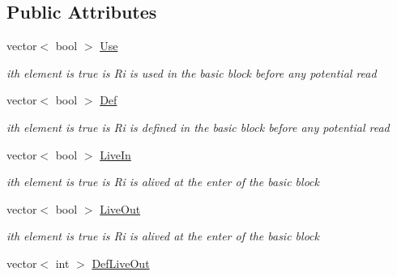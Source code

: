 \subsection*{Public Attributes}
\begin{DoxyCompactItemize}
\item 
\hypertarget{class_basic__block_ab7802e6562cdb846d793a5a834b4678f}{}vector$<$ bool $>$ \hyperlink{class_basic__block_ab7802e6562cdb846d793a5a834b4678f}{Use}\label{class_basic__block_ab7802e6562cdb846d793a5a834b4678f}

\begin{DoxyCompactList}\small\item\em ith element is true is Ri is used in the basic block before any potential read \end{DoxyCompactList}\item 
\hypertarget{class_basic__block_a061288c8556fe1e29c75cc1864d67700}{}vector$<$ bool $>$ \hyperlink{class_basic__block_a061288c8556fe1e29c75cc1864d67700}{Def}\label{class_basic__block_a061288c8556fe1e29c75cc1864d67700}

\begin{DoxyCompactList}\small\item\em ith element is true is Ri is defined in the basic block before any potential read \end{DoxyCompactList}\item 
\hypertarget{class_basic__block_ac772aedee0db949ff13844ee8a809e62}{}vector$<$ bool $>$ \hyperlink{class_basic__block_ac772aedee0db949ff13844ee8a809e62}{Live\+In}\label{class_basic__block_ac772aedee0db949ff13844ee8a809e62}

\begin{DoxyCompactList}\small\item\em ith element is true is Ri is alived at the enter of the basic block \end{DoxyCompactList}\item 
\hypertarget{class_basic__block_a054946200a56d8c248f5a2ad7f1e1790}{}vector$<$ bool $>$ \hyperlink{class_basic__block_a054946200a56d8c248f5a2ad7f1e1790}{Live\+Out}\label{class_basic__block_a054946200a56d8c248f5a2ad7f1e1790}

\begin{DoxyCompactList}\small\item\em ith element is true is Ri is alived at the enter of the basic block \end{DoxyCompactList}\item 
\hypertarget{class_basic__block_ae55324175eed352b99bdf3b366cdb168}{}vector$<$ int $>$ \hyperlink{class_basic__block_ae55324175eed352b99bdf3b366cdb168}{Def\+Live\+Out}\label{class_basic__block_ae55324175eed352b99bdf3b366cdb168}


\end{DoxyCompactItemize}
